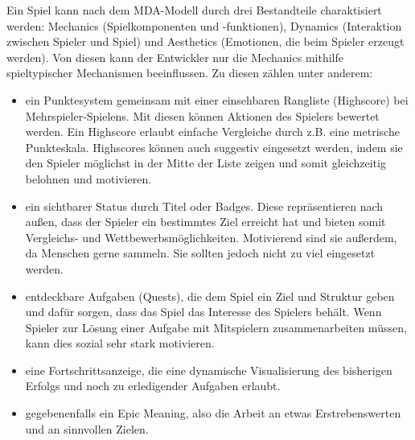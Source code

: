 Ein Spiel kann nach dem MDA-Modell durch drei Bestandteile charaktisiert werden: Mechanics (Spielkomponenten und -funktionen), Dynamics (Interaktion zwischen Spieler und Spiel) und Aesthetics (Emotionen, die beim Spieler erzeugt werden).\cite{Src:GamifDesign} Von diesen kann der Entwickler nur die Mechanics mithilfe spieltypischer Mechanismen beeinflussen. Zu diesen zählen unter anderem:
\begin{itemize}
\item ein Punktesystem gemeinsam mit einer einsehbaren Rangliste (Highscore) bei Mehrspieler-Spielens. Mit diesen können Aktionen des Spielers bewertet werden. Ein Highscore erlaubt einfache Vergleiche durch z.B. eine metrische Punkteskala.\cite{Src:GamifKochOtt} Highscores können auch suggestiv eingesetzt werden, indem sie den Spieler möglichst in der Mitte der Liste zeigen und somit gleichzeitig belohnen und motivieren.\cite{Src:GamifDesign}
\item ein sichtbarer Status durch Titel oder Badges. Diese repräsentieren nach außen, dass der Spieler ein bestimmtes Ziel erreicht hat und bieten somit Vergleichs- und Wettbewerbsmöglichkeiten.\cite{Src:GamifKochOtt} Motivierend sind sie außerdem, da Menschen gerne sammeln. Sie sollten jedoch nicht zu viel eingesetzt werden.\cite{Src:GamifDesign}
\item entdeckbare Aufgaben (Quests), die dem Spiel ein Ziel und Struktur geben und dafür sorgen, dass das  Spiel das Interesse des Spielers behält. Wenn Spieler zur Lösung einer Aufgabe mit Mitspielern zusammenarbeiten müssen, kann dies sozial sehr stark motivieren.\cite{Src:GamifDesign}
\item eine Fortschrittsanzeige, die eine dynamische Visualisierung des bisherigen Erfolgs und noch zu erledigender Aufgaben erlaubt.\cite{Src:GamifKochOtt}
\item gegebenenfalls ein Epic Meaning, also die Arbeit an etwas Erstrebenswerten und an sinnvollen Zielen.\cite{Src:GamifKochOtt}
\end{itemize}
